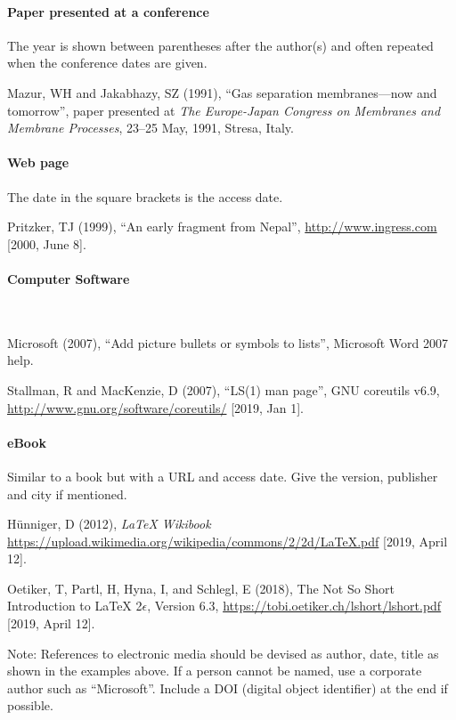 \documentclass[a5paper, 10pt]{article}
\begin{document}
\paragraph{Paper presented at a conference}
The year is shown between parentheses after the author(s) and often repeated when the conference dates are given.

Mazur, WH and Jakabhazy, SZ (1991), ``Gas separation 
  membranes---now 
  and tomorrow'', paper presented at \textit{The Europe-Japan
  Congress on Membranes and Membrane Processes}, 23--25 May, 1991,
  Stresa, Italy.

\paragraph{Web page}
The date in the square brackets is the access date.

Pritzker, TJ (1999), ``An early fragment from Nepal'',
  \url{http://www.ingress.com} [2000, June 8].  

\paragraph{Computer Software}
\label{page:ref_compsoftware}
~

Microsoft (2007), ``Add picture bullets or symbols to lists'',
  Microsoft Word 2007 help.

Stallman, R and MacKenzie, D (2007), ``LS(1) man page'', GNU
  coreutils v6.9, \url{http://www.gnu.org/software/coreutils/} [2019, Jan 1].
  
\paragraph{eBook}
Similar to a book but with a URL and access date. Give the version, publisher and city if mentioned. 

H\"unniger, D (2012), \textit{LaTeX Wikibook} 
  \url{https://upload.wikimedia.org/wikipedia/commons/2/2d/LaTeX.pdf} [2019, April 12].
 
Oetiker, T, Partl, H, Hyna, I, and Schlegl, E (2018), The Not So 
 Short Introduction to LaTeX 2$\epsilon$, Version 6.3,  \url{https://tobi.oetiker.ch/lshort/lshort.pdf} [2019, April 12].



Note: References to electronic media should be devised as author,
date, title as shown in the examples above. If a person cannot be 
named, use a corporate author such as ``Microsoft''. Include a DOI (digital object identifier) at the end if possible.
\end{document}
